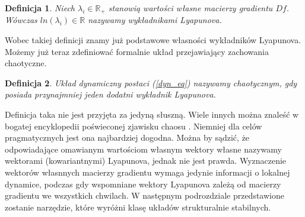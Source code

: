 \documentclass[12pt]{article}
\newtheorem{defi}{Definicja}
\begin{document}
\begin{defi}
	Niech $ \lambda_{i} \in \mathbb{R}_{+} $ stanowią wartości własne macierzy gradientu $ Df $. Wówczas $ ln(\lambda_{i}) \in \mathbb{R} $ nazywamy wykładnikami Lyapunova.
\end{defi} 
Wobec takiej definicji znamy już podstawowe własności wykładników Lyapunova. \newline
Możemy już teraz zdefiniować formalnie układ przejawiający zachowania chaotyczne.
\begin{defi}
	Układ dynamiczny postaci (\ref{dyn_eq}) nazywamy chaotycznym, gdy posiada przynajmniej jeden dodatni wykładnik Lyapunova.
\end{defi}
Definicja taka nie jest przyjęta za jedyną słuszną. Wiele innych można znaleść w bogatej encyklopedii poświeconej zjawisku chaosu \cite{Encyclopedie}. Niemniej dla celów pragmatycznych jest ona najbardziej dogodna.\newline
Można by sądzić, że odpowiadające omawianym wartościom własnym wektory własne nazywamy wektorami (kowariantnymi) Lyapunova, jednak nie jest prawda. Wyznaczenie wektorów własnnych macierzy gradientu wymaga jedynie informacji o lokalnej dynamice, podczas gdy wspomniane wektory Lyapunova zależą od macierzy gradientu we wszystkich chwilach. \newline
W następnym podrozdziale przedstawione zostanie narzędzie, które wyróżni klasę układów strukturalnie stabilnych.
\end{document}
